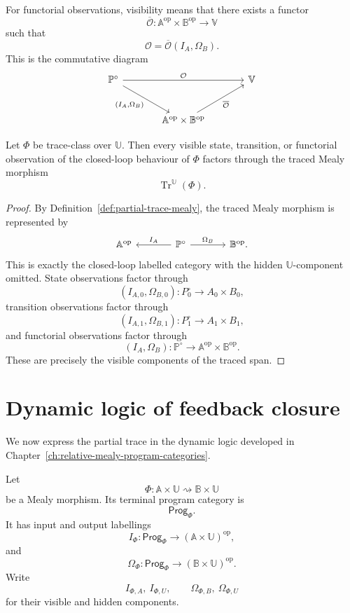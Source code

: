 For functorial observations, visibility means that there exists a functor
\[
\overline{\mathcal O}:
\mathbb A^{\mathrm{op}}\times\mathbb B^{\mathrm{op}}\to\mathbb V
\]
such that
\[
\mathcal O=
\overline{\mathcal O}(I_A,\Omega_B).
\]
This is the commutative diagram
\[
\begin{tikzcd}[column sep=large,row sep=large]
\mathbb P^\circ
  \arrow[rr, "\mathcal O"]
  \arrow[dr, "{(I_A,\Omega_B)}"']
&&
\mathbb V
\\
&
\mathbb A^{\mathrm{op}}\times\mathbb B^{\mathrm{op}}
  \arrow[ur, "\overline{\mathcal O}"']
&
\end{tikzcd}
\]

\begin{proposition}
\label{prop:privacy-by-feedback-hiding}
Let \(\Phi\) be trace-class over \(\mathbb U\).  Then every visible state,
transition, or functorial observation of the closed-loop behaviour of \(\Phi\)
factors through the traced Mealy morphism
\[
\operatorname{Tr}^{\mathbb U}(\Phi).
\]
\end{proposition}

\begin{proof}
By Definition~\ref{def:partial-trace-mealy}, the traced Mealy morphism is
represented by
\[
\begin{tikzcd}[column sep=large]
\mathbb A^{\mathrm{op}}
&
\mathbb P^\circ
  \arrow[l, "I_A"']
  \arrow[r, "\Omega_B"]
&
\mathbb B^{\mathrm{op}} .
\end{tikzcd}
\]
This is exactly the closed-loop labelled category with the hidden
\(\mathbb U\)-component omitted.  State observations factor through
\[
(I_{A,0},\Omega_{B,0}):P^\circ_0\to A_0\times B_0,
\]
transition observations factor through
\[
(I_{A,1},\Omega_{B,1}):P^\circ_1\to A_1\times B_1,
\]
and functorial observations factor through
\[
(I_A,\Omega_B):
\mathbb P^\circ\to
\mathbb A^{\mathrm{op}}\times\mathbb B^{\mathrm{op}}.
\]
These are precisely the visible components of the traced span.
\end{proof}

\section{Dynamic logic of feedback closure}
\label{sec:dynamic-logic-feedback-closure}

We now express the partial trace in the dynamic logic developed in
Chapter~\ref{ch:relative-mealy-program-categories}.

Let
\[
\Phi:
\mathbb A\times\mathbb U
\rightsquigarrow
\mathbb B\times\mathbb U
\]
be a Mealy morphism.  Its terminal program category is
\[
\mathsf{Prog}_\Phi.
\]
It has input and output labellings
\[
I_\Phi:
\mathsf{Prog}_\Phi\to
(\mathbb A\times\mathbb U)^{\mathrm{op}},
\]
and
\[
\Omega_\Phi:
\mathsf{Prog}_\Phi\to
(\mathbb B\times\mathbb U)^{\mathrm{op}}.
\]
Write
\[
I_{\Phi,A},\ I_{\Phi,U},
\qquad
\Omega_{\Phi,B},\ \Omega_{\Phi,U}
\]
for their visible and hidden components.


